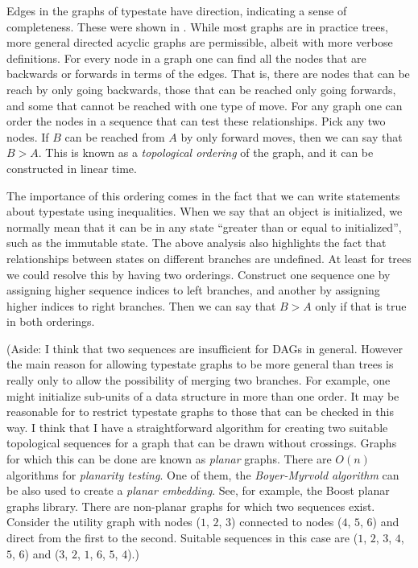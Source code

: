 \documentclass[10pt]{amsart}
\begin{document}
Edges in the graphs of typestate have direction, indicating a sense of
completeness.  These were shown in .  While
most graphs are in practice trees, more general directed acyclic
graphs are permissible, albeit with more verbose definitions.  For
every node in a graph one can find all the nodes that are backwards or
forwards in terms of the edges.  That is, there are nodes that can be
reach by only going backwards, those that can be reached only going
forwards, and some that cannot be reached with one type of move.  For
any graph one can order the nodes in a sequence that can test these
relationships.  Pick any two nodes.  If $B$ can be reached from $A$ by
only forward moves, then we can say that $B>A$.  This is known as a
\emph{topological ordering} of the graph, and it can be constructed in
linear time.

The importance of this ordering comes in the fact that we can write
statements about typestate using inequalities.  When we say that an
object is initialized, we normally mean that it can be in any state
``greater than or equal to initialized'', such as the immutable state.
The above analysis also highlights the fact that relationships between
states on different branches are undefined.  At least for trees we
could resolve this by having two orderings.  Construct one sequence
one by assigning higher sequence indices to left branches, and another
by assigning higher indices to right branches.  Then we can say that
$B>A$ only if that is true in both orderings.

(Aside: I think that two sequences are insufficient for DAGs in
general.  However the main reason for allowing typestate graphs to be
more general than trees is really only to allow the possibility of
merging two branches.  For example, one might initialize sub-units of
a data structure in more than one order.  It may be reasonable for
\Utop to restrict typestate graphs to those that can be checked in
this way.  I think that I have a straightforward algorithm for
creating two suitable topological sequences for a graph that can be
drawn without crossings.  Graphs for which this can be done are known
as \emph{planar} graphs.  There are $O(n)$ algorithms for
\emph{planarity testing}.  One of them, the \emph{Boyer-Myrvold
  algorithm} can be also used to create a \emph{planar embedding}.
See, for example, the Boost planar graphs library.  There are
non-planar graphs for which two sequences exist.  Consider the utility
graph with nodes ($1$, $2$, $3$) connected to nodes ($4$, $5$, $6$)
and direct from the first to the second.  Suitable sequences in this
case are ($1$, $2$, $3$, $4$, $5$, $6$) and ($3$, $2$, $1$, $6$, $5$,
$4$).)
\end{document}
